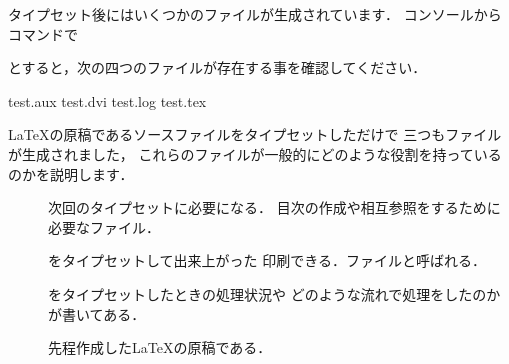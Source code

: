 タイプセット後にはいくつかのファイルが生成されています．
コンソールからコマンドで
\begin{InTerm}
\end{InTerm}
とすると，次の四つのファイルが存在する事を確認してください．

\begin{OutTerm}
test.aux test.dvi test.log test.tex
\end{OutTerm}

{\LaTeX}の原稿であるソースファイルをタイプセットしただけで
三つもファイルが生成されました，%
これらのファイルが一般的にどのような役割を持っているのかを説明します．
\begin{description}
 \item[\normalfont{}] 
  次回のタイプセットに必要になる．
  目次の作成や相互参照をするために必要なファイル．

 \item[\normalfont{}] 
  をタイプセットして出来上がった%
  印刷できる．ファイルと呼ばれる．%

 \item[\normalfont{}] 
  をタイプセットしたときの処理状況や
  どのような流れで処理をしたのかが書いてある．%

 \item[\normalfont{}] 
  先程作成した{\LaTeX}の原稿である． 
\end{description}



